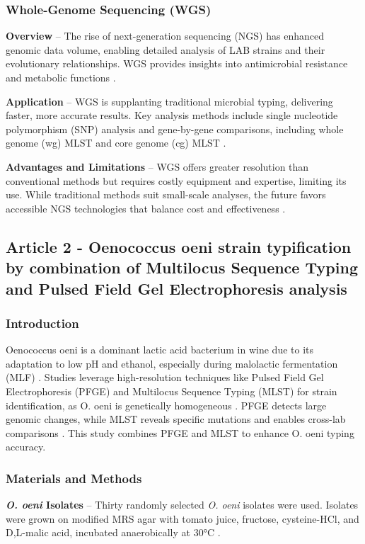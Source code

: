 \subsubsection{Whole-Genome Sequencing (WGS)}
\textbf{Overview} – The rise of next-generation sequencing (NGS) has enhanced genomic data volume, enabling detailed analysis of LAB strains and their evolutionary relationships. WGS provides insights into antimicrobial resistance and metabolic functions \cite*{L4-MolTyping}.

\textbf{Application} – WGS is supplanting traditional microbial typing, delivering faster, more accurate results. Key analysis methods include single nucleotide polymorphism (SNP) analysis and gene-by-gene comparisons, including whole genome (wg) MLST and core genome (cg) MLST \cite*{L4-MolTyping}.

\textbf{Advantages and Limitations} – WGS offers greater resolution than conventional methods but requires costly equipment and expertise, limiting its use. While traditional methods suit small-scale analyses, the future favors accessible NGS technologies that balance cost and effectiveness \cite*{L4-MolTyping}.

\subsection{Article 2 - Oenococcus oeni strain typification by combination of Multilocus Sequence Typing and Pulsed Field Gel Electrophoresis analysis}

\subsubsection*{Introduction}
Oenococcus oeni is a dominant lactic acid bacterium in wine due to its adaptation to low pH and ethanol, especially during malolactic fermentation (MLF) \cite*{L4-MST+PFGE}. Studies leverage high-resolution techniques like Pulsed Field Gel Electrophoresis (PFGE) and Multilocus Sequence Typing (MLST) for strain identification, as O. oeni is genetically homogeneous \cite*{L4-MST+PFGE}. PFGE detects large genomic changes, while MLST reveals specific mutations and enables cross-lab comparisons \cite*{L4-MST+PFGE}. This study combines PFGE and MLST to enhance O. oeni typing accuracy.

\subsubsection*{Materials and Methods}
\textbf{\textit{O. oeni} Isolates} – Thirty randomly selected \textit{O. oeni} isolates were used. Isolates were grown on modified MRS agar with tomato juice, fructose, cysteine-HCl, and D,L-malic acid, incubated anaerobically at 30°C \cite*{L4-MST+PFGE}.

